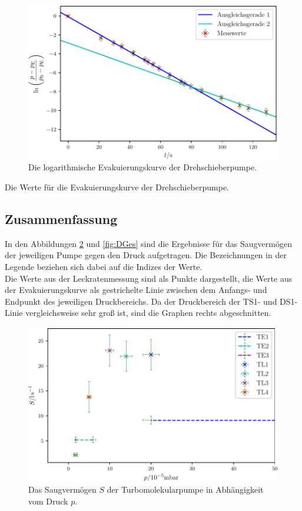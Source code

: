 \begin{figure}
\centering
\includegraphics[width=\linewidth-70pt,height=\textheight-70pt,keepaspectratio]{content/images/DSL.pdf}
\caption{Die logarithmische Evakuierungskurve der Drehschieberpumpe.}
\label{fig:DSL}
\end{figure}

\begin{table}
\centering
\caption{Die Werte für die Evakuierungskurve der Drehschieberpumpe.}

\label{tab:DS}
\end{table}

\subsection{Zusammenfassung} 

In den Abbildungen \ref{fig:TGes} und \ref{fig:DGes} sind die Ergebnisse für das Saugvermögen der jeweiligen Pumpe gegen den Druck aufgetragen. Die Bezeichnungen in der Legende beziehen sich dabei auf die Indizes der Werte.\\
Die Werte aus der Leckratenmessung sind als Punkte dargestellt, die Werte aus der Evakuierungskurve als gestrichelte Linie zwischen dem Anfangs- und Endpunkt des jeweiligen Druckbereichs. Da der Druckbereich der TS1- und DS1-Linie vergleichsweise sehr groß ist, sind die Graphen rechts abgeschnitten. 

\begin{figure}
\centering
\includegraphics[width=\linewidth-70pt,height=\textheight-70pt,keepaspectratio]{content/images/TGes.pdf}
\caption{Das Saugvermögen $S$ der Turbomolekularpumpe in Abhängigkeit vom Druck $p$.}
\label{fig:TGes}
\end{figure}

